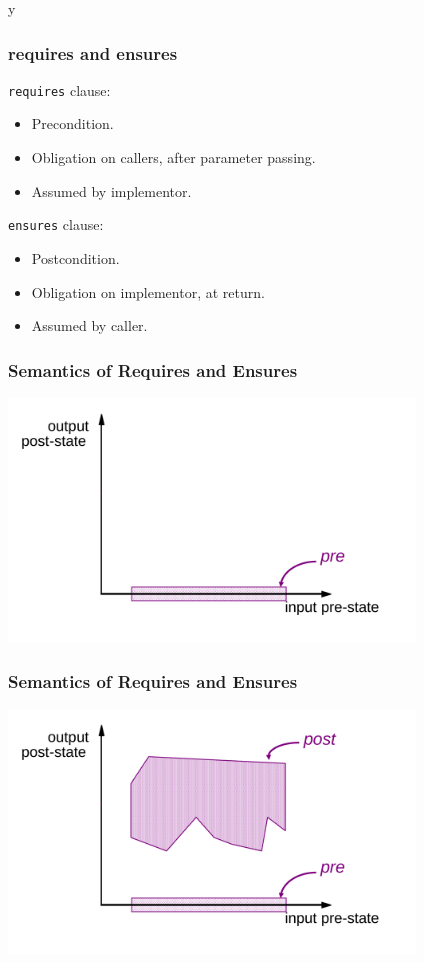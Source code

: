 \if y\MAKEHANDOUTS \documentclass[t,compress,landscape,handout]{beamer}
\begin{document}
\begin{frame}[fragile]
\frametitle{requires and ensures}

\lstinline!requires! clause:
\begin{itemize}
\item
Precondition.

\item
Obligation on callers, after parameter passing.

\item
Assumed by implementor.
\end{itemize}

\lstinline!ensures! clause:
\begin{itemize}
\item
Postcondition.

\item
Obligation on implementor, at return.

\item
Assumed by caller.
\end{itemize}
\end{frame}

\begin{frame}
\frametitle{Semantics of Requires and Ensures}
\includegraphics[width=4.25in]{requires}
\end{frame}

\begin{frame}
\frametitle{Semantics of Requires and Ensures}
\includegraphics[width=4.25in]{ensures}
\end{frame}
\end{document}
